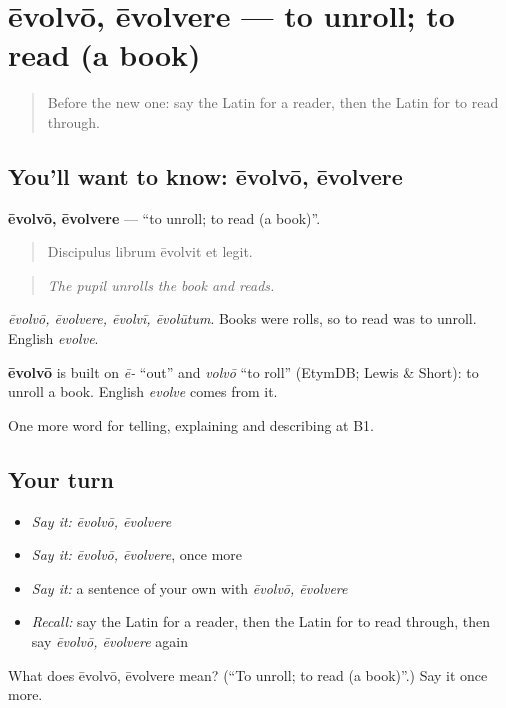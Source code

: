 \section[ēvolvō, ēvolvere]{ēvolvō, ēvolvere — to unroll; to read (a book)}

\label{lesson:LA-C550-evolvo}



\begin{quote}
Before the new one: say the Latin for a reader, then the Latin for to read through.
\end{quote}

\subsection*{You'll want to know: ēvolvō, ēvolvere}
\textbf{ēvolvō, ēvolvere} — \textquotedblleft{}to unroll; to read (a book)\textquotedblright{}.

\begin{quote}
Discipulus librum ēvolvit et legit.
\end{quote}

\begin{quote}
\emph{The pupil unrolls the book and reads.}
\end{quote}

\emph{ēvolvō, ēvolvere, ēvolvī, ēvolūtum}. Books were rolls, so to read was to unroll. English \emph{evolve}.

\begin{cousinweb}
\textbf{ēvolvō} is built on \emph{ē-} \textquotedblleft{}out\textquotedblright{} and \emph{volvō} \textquotedblleft{}to roll\textquotedblright{} (EtymDB; Lewis \& Short): to unroll a book. English \emph{evolve} comes from it.
\end{cousinweb}

\begin{grammarlens}[title={What you've built}]
One more word for telling, explaining and describing at B1.
\end{grammarlens}

\subsection*{Your turn}
\begin{itemize}
\raggedright
  \item \emph{Say it:} \emph{ēvolvō, ēvolvere}
  \item \emph{Say it:} \emph{ēvolvō, ēvolvere}, once more
  \item \emph{Say it:} a sentence of your own with \emph{ēvolvō, ēvolvere}
  \item \emph{Recall:} say the Latin for a reader, then the Latin for to read through, then say \emph{ēvolvō, ēvolvere} again
\end{itemize}

\begin{tcolorbox}[breakable,colback=teal!4,colframe=teal!35!black,title={Before you move on}]
What does ēvolvō, ēvolvere mean? (\textquotedblleft{}To unroll; to read (a book)\textquotedblright{}.) Say it once more.
\end{tcolorbox}

